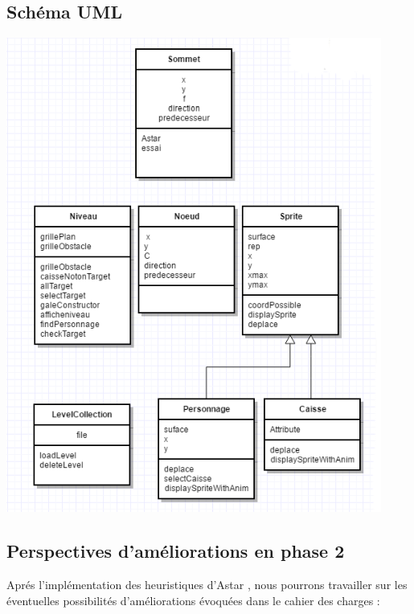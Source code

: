 \documentclass{article}
\begin{document}
		
		\newpage
		\begin{center}

	\section{Schéma UML}
	\vspace{0.3cm}
	\includegraphics[scale=1.1]{../Screenshots/UML.png}
			
		\end{center}
	\newpage
	\begin{center}
	\section{Perspectives d'améliorations en phase 2}
	\end{center}
	\vspace{1cm}
	 Aprés l'implémentation des heuristiques d'Astar , nous pourrons travailler sur les éventuelles possibilités d'améliorations évoquées dans le cahier des charges :
	 \vspace{0.5cm}
\end{document}
